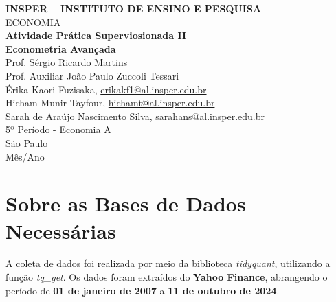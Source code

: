 \documentclass[a4paper,12pt]{article}[abntex2]
\begin{document}
\begin{titlepage}
    \centering
    \vspace*{1cm}
    \Large\textbf{INSPER – INSTITUTO DE ENSINO E PESQUISA}\\
    \Large ECONOMIA\\
    \vspace{1.5cm}
    \Large\textbf{Atividade Prática Superviosionada II}\\
    \textbf{Econometria Avançada}\\
    \vspace{1.5cm}
    Prof. Sérgio Ricardo Martins \\
    Prof. Auxiliar João Paulo Zuccoli Tessari \\
    \vfill
    \small
    Érika Kaori Fuzisaka, \href{mailto:erikakf1@al.insper.edu.br}{erikakf1@al.insper.edu.br}\\
    Hicham Munir Tayfour, \href{mailto:hichamt@al.insper.edu.br}{hichamt@al.insper.edu.br}\\
    Sarah de Araújo Nascimento Silva, \href{sarahans@al.insper.edu.br}{sarahans@al.insper.edu.br}\\
    5º Período - Economia A\\
    \vfill
    São Paulo\\
    Mês/Ano
\end{titlepage}

\newpage
\tableofcontents
\thispagestyle{empty} %

\newpage 
\listoffigures
\thispagestyle{empty} %

\newpage
\listoftables
\thispagestyle{empty} %

\newpage
\setcounter{page}{1} %
\justify
\onehalfspacing

\section*{\textbf{Sobre as Bases de Dados Necessárias}}

A coleta de dados foi realizada por meio da biblioteca \textit{tidyquant}, utilizando a função \textit{tq\_get}. Os dados foram extraídos do \textbf{Yahoo Finance}, abrangendo o período de \textbf{01 de janeiro de 2007} a \textbf{11 de outubro de 2024}.
\end{document}
